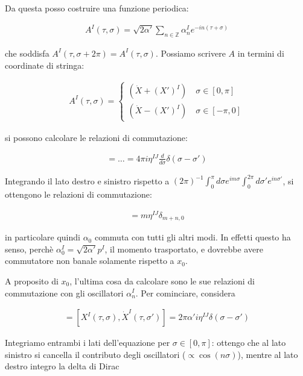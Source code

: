 \documentclass{report}
\begin{document}
Da questa posso costruire una funzione periodica: 

\begin{align}
    A^I (\tau, \sigma) = \sqrt{2\alpha'}\sum_{n\in \mathbb{Z}} \alpha_n^I e^{-in(\tau + \sigma)}
\end{align}

che soddisfa \(A^I(\tau, \sigma +2\pi) = A^I(\tau, \sigma)\). Possiamo scrivere \(A\) in termini di coordinate di stringa: 

\begin{align}
    A^I(\tau, \sigma) = \begin{cases}
        (\dot{X} + (X')^I) \quad \sigma \in [0, \pi] \\
        (\dot{X} - (X')^I) \quad \sigma \in [-\pi, 0]
    \end{cases}
\end{align}

si possono calcolare le relazioni di commutazione: 

\begin{align}
    [A^I (\tau, \sigma), A^J(\tau, \sigma')] = \ldots = 4\pi i \eta^{IJ} \frac{d}{d\sigma}\delta(\sigma-\sigma')
\end{align}

Integrando il lato destro e sinistro rispetto a \((2\pi)^{-1}\int_0^\pi d\sigma e^{im\sigma}\int_0^{2\pi}d\sigma' e^{in\sigma'}\), si ottengono le relazioni di commutazione: 

\begin{align}
    [\alpha_m^I, \alpha_n^J] = m \eta^{IJ}\delta_{m+n, 0}
\end{align}

in particolare quindi \(\alpha_0\) commuta con tutti gli altri modi. In effetti questo ha senso, perchè \(\alpha_0^I = \sqrt{2\alpha'}p^I\), il momento trasportato, e dovrebbe avere commutatore non banale solamente rispetto a \(x_0\). 

A proposito di \(x_0\), l'ultima cosa da calcolare sono le sue relazioni di commutazione con gli oscillatori \(\alpha^I_n\). Per cominciare, considera 

\begin{align}
    [X^I(\tau, \sigma), 2\pi\alpha' p^{\tau J}(\tau, \sigma')] = [X^I(\tau, \sigma), \dot{X}^I(\tau, \sigma')] = 2\pi\alpha' i \eta^{IJ}\delta(\sigma-\sigma')
\end{align}


Integriamo entrambi i lati dell'equazione per \(\sigma \in [0, \pi]\): ottengo che al lato sinistro si cancella il contributo degli oscillatori (\(\propto \cos(n\sigma)\)), mentre al lato destro integro la delta di Dirac
\end{document}
